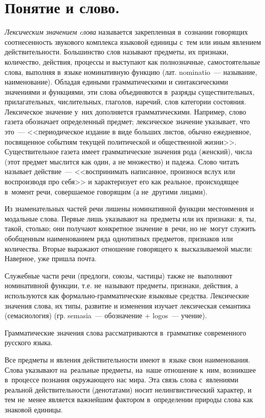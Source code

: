 \documentclass[12pt]{article}
\theoremstyle{definition}
\theoremstyle{remark}
\numberwithin{equation}{section}
\begin{document}
\section{Понятие и слово.}
\textsl{Лексическим значением cлова} называется закрепленная
в~сознании говорящих соотнесенность звукового комплекса языковой
единицы с~тем или иным явлением действительности.
Большинство слов называют предметы, их признаки, количество,
действия, процессы и выступают как полнозначные, самостоятельные
слова, выполняя в~языке номинативную функцию (лат. nominatio~---
называние, наименование). Обладая едиными грамматическими и
синтаксическими значениями и функциями, эти слова объединяются
в~разряды существительных, прилагательных, числительных, глаголов,
наречий, слов категории состояния. Лексическое значение у~них
дополняется грамматическими. Например, слово газета обозначает
определенный предмет; лексическое значение указывает, что это~---
<<периодическое издание в виде больших листов, обычно ежедневное,
посвященное событиям текущей политической и общественной жизни>>.
Существительное газета имеет грамматические значения рода (женский),
числа (этот предмет мыслится как один, а не множество) и падежа.
Слово читать называет действие~--- <<воспринимать написанное, произнося
вслух или воспроизводя про себя>> и характеризует его как реальное,
происходящее в~момент речи, совершаемое говорящим (а не~другими лицами).

Из знаменательных частей речи лишены номинативной функции местоимения
и модальные слова. Первые лишь указывают на~предметы или их признаки:
я, ты, такой, столько; они получают конкретное значение в~речи,
но не~могут служить обобщенным наименованием ряда однотипных предметов,
признаков или количества. Вторые выражают отношение говорящего к~высказываемой
мысли: Наверное, уже пришла почта.

Служебные части речи (предлоги, союзы, частицы) также не~выполняют
номинативной функции, т.е. не~называют предметы, признаки, действия,
а используются как формально-грамматические языковые средства.
Лексические значения слова, их типы, развитие и изменения изучает
лексическая семантика (семасиология) (гр. semasia~--- обозначение +
logos~--- учение).

Грамматические значения слова рассматриваются в~грамматике современного
русского языка.

Все предметы и явления действительности имеют в~языке свои наименования.
Слова указывают на~реальные предметы, на~наше отношение к~ним, возникшее
в~процессе познания окружающего нас мира. Эта связь слова с~явлениями
реальной действительности (денотатами) носит нелингвистический характер,
и тем не~менее является важнейшим фактором в~определении природы слова
как знаковой единицы.
\end{document}
